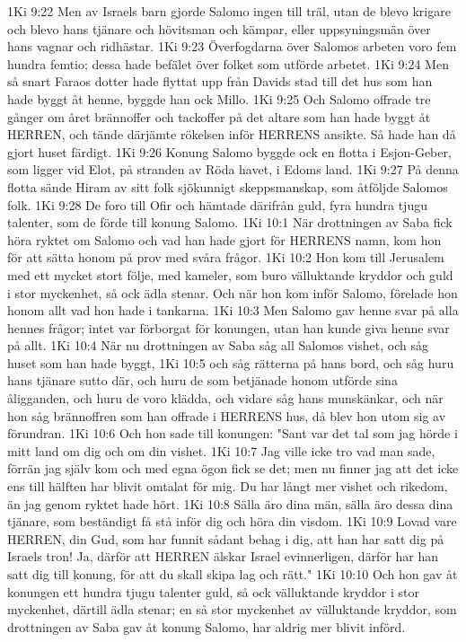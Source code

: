 1Ki 9:22  Men av Israels barn gjorde Salomo ingen till träl, utan de blevo krigare och blevo hans tjänare och hövitsman och kämpar, eller uppsyningsmän över hans vagnar och ridhästar.
1Ki 9:23  Överfogdarna över Salomos arbeten voro fem hundra femtio; dessa hade befälet över folket som utförde arbetet.
1Ki 9:24  Men så snart Faraos dotter hade flyttat upp från Davids stad till det hus som han hade byggt åt henne, byggde han ock Millo.
1Ki 9:25  Och Salomo offrade tre gånger om året brännoffer och tackoffer på det altare som han hade byggt åt HERREN, och tände därjämte rökelsen inför HERRENS ansikte. Så hade han då gjort huset färdigt.
1Ki 9:26  Konung Salomo byggde ock en flotta i Esjon-Geber, som ligger vid Elot, på stranden av Röda havet, i Edoms land.
1Ki 9:27  På denna flotta sände Hiram av sitt folk sjökunnigt skeppsmanskap, som åtföljde Salomos folk.
1Ki 9:28  De foro till Ofir och hämtade därifrån guld, fyra hundra tjugu talenter, som de förde till konung Salomo.
1Ki 10:1  När drottningen av Saba fick höra ryktet om Salomo och vad han hade gjort för HERRENS namn, kom hon för att sätta honom på prov med svåra frågor.
1Ki 10:2  Hon kom till Jerusalem med ett mycket stort följe, med kameler, som buro välluktande kryddor och guld i stor myckenhet, så ock ädla stenar. Och när hon kom inför Salomo, förelade hon honom allt vad hon hade i tankarna.
1Ki 10:3  Men Salomo gav henne svar på alla hennes frågor; intet var förborgat för konungen, utan han kunde giva henne svar på allt.
1Ki 10:4  När nu drottningen av Saba såg all Salomos vishet, och såg huset som han hade byggt,
1Ki 10:5  och såg rätterna på hans bord, och såg huru hans tjänare sutto där, och huru de som betjänade honom utförde sina åligganden, och huru de voro klädda, och vidare såg hans munskänkar, och när hon såg brännoffren som han offrade i HERRENS hus, då blev hon utom sig av förundran.
1Ki 10:6  Och hon sade till konungen: "Sant var det tal som jag hörde i mitt land om dig och om din vishet.
1Ki 10:7  Jag ville icke tro vad man sade, förrän jag själv kom och med egna ögon fick se det; men nu finner jag att det icke ens till hälften har blivit omtalat för mig. Du har långt mer vishet och rikedom, än jag genom ryktet hade hört.
1Ki 10:8  Sälla äro dina män, sälla äro dessa dina tjänare, som beständigt få stå inför dig och höra din visdom.
1Ki 10:9  Lovad vare HERREN, din Gud, som har funnit sådant behag i dig, att han har satt dig på Israels tron! Ja, därför att HERREN älskar Israel evinnerligen, därför har han satt dig till konung, för att du skall skipa lag och rätt."
1Ki 10:10  Och hon gav åt konungen ett hundra tjugu talenter guld, så ock välluktande kryddor i stor myckenhet, därtill ädla stenar; en så stor myckenhet av välluktande kryddor, som drottningen av Saba gav åt konung Salomo, har aldrig mer blivit införd.
